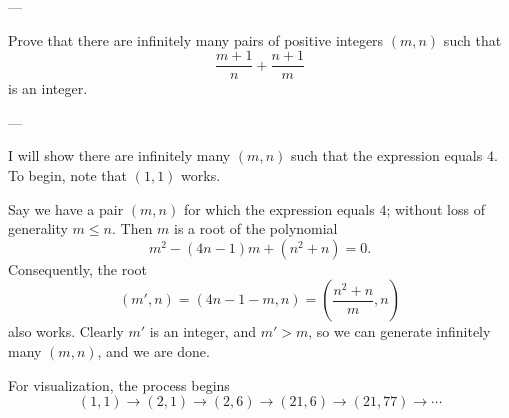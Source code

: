 
---

Prove that there are infinitely many pairs of positive integers $(m,n)$ such that \[\frac{m+1}n+\frac{n+1}m\]
is an integer.

---

I will show there are infinitely many $(m,n)$ such that the expression equals $4$. To begin, note that $(1,1)$ works.

Say we have a pair $(m,n)$ for which the expression equals $4$; without loss of generality $m\le n$. Then $m$ is a root of the polynomial \[m^2-(4n-1)m+\left(n^2+n\right)=0.\]
Consequently, the root \[(m',n)=(4n-1-m,n)=\left(\frac{n^2+n}m,n\right)\]
also works. Clearly $m'$ is an integer, and $m'>m$, so we can generate infinitely many $(m,n)$, and we are done.
\begin{boxremark}
    For visualization, the process begins \[(1,1)\to(2,1)\to(2,6)\to(21,6)\to(21,77)\to\cdots\]
\end{boxremark}

